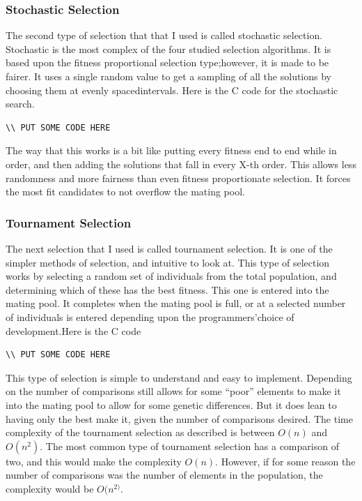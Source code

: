 \subsubsection{Stochastic Selection}
The second type of selection that that I used is called stochastic selection.
Stochastic is the most complex of the four studied selection algorithms.
It is based upon the fitness proportional selection type;however, it is made to be fairer.
It uses a single random value to get 
a sampling of all the solutions by choosing them at evenly spacedintervals.
Here is the C code for the stochastic search.
\begin{lstlisting}[language=C]
\\ PUT SOME CODE HERE
\end{lstlisting}
The way that this works is a bit like putting every fitness end to end while in
order, and then adding the solutions that fall in every X-th order. 
This allows less randomness and more fairness than even fitness proportionate selection. 
It forces the most fit candidates to not overflow the mating pool.

\subsubsection{Tournament Selection}
The next selection that I used is called tournament selection. 
It is one of the simpler methods of selection, and intuitive to look at.
This type of selection works by selecting a random set of individuals from the total population, 
and determining which of these has the best fitness. This one is entered into the mating pool. 
It completes when the mating pool is full, or at a selected number of individuals is entered 
depending upon the programmers’choice of development.Here is the C code
\begin{lstlisting}[language=C]
\\ PUT SOME CODE HERE
\end{lstlisting}
This type of selection is simple to understand and easy to implement.
Depending on the number of comparisons still allows for some ``poor'' elements to make it into
the mating pool to allow for some genetic differences. 
But it does lean to having only the best make it, given the number of comparisons desired.
The time complexity of the tournament selection as described is between $O(n)$ and $O(n^{2})$.
The most common type of tournament selection has a comparison of two, and this would make the 
complexity $O(n)$. However, if for some reason the number of comparisons was the number of elements
in the population, the complexity would be $O(n^{2)}$.

